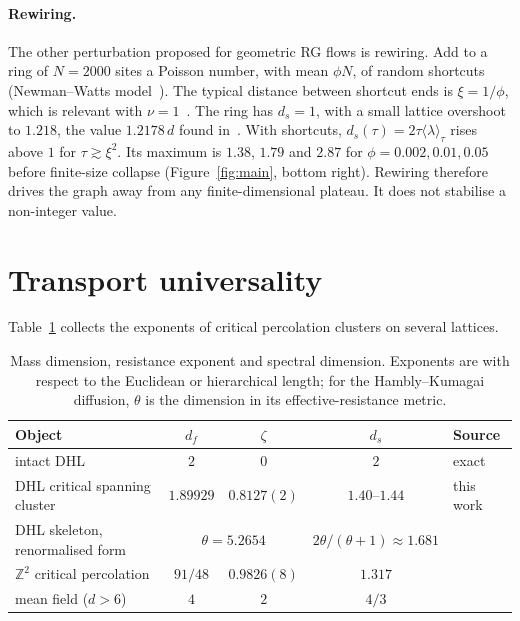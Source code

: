 \documentclass[11pt]{article}
\theoremstyle{remark}\newtheorem*{remark}{Remark}
\newcommand{\ZZ}{\mathbb{Z}}
\begin{document}
\paragraph{Rewiring.} The other perturbation proposed for geometric RG flows is rewiring. Add to a ring of $N=2000$ sites a
Poisson number, with mean $\phi N$, of random shortcuts (Newman--Watts model~\cite{WattsStrogatz,NewmanWatts}). The typical
distance between shortcut ends is $\xi=1/\phi$, which is relevant with $\nu=1$~\cite{NewmanWatts}. The ring has
$d_s=1$, with a small lattice overshoot to $1.218$, the value $1.2178\,d$ found in~\cite{Chen2026_qgc}. With shortcuts,
$d_s(\tau)=2\tau\langle\lambda\rangle_\tau$ rises above $1$ for $\tau\gtrsim\xi^2$. Its maximum is $1.38$, $1.79$ and $2.87$ for $\phi=0.002,0.01,0.05$
before finite-size collapse (Figure~\ref{fig:main}, bottom right). Rewiring therefore drives the graph away from any
finite-dimensional plateau. It does not stabilise a non-integer value.

\section{Transport universality}
\label{sec:universality}

Table~\ref{tab:compare} collects the exponents of critical percolation clusters on several lattices.

\begin{table}[ht]
\centering
\caption{Mass dimension, resistance exponent and spectral dimension. Exponents are with respect to the Euclidean or
hierarchical length; for the Hambly--Kumagai diffusion, $\theta$ is the dimension in its effective-resistance metric.}
\label{tab:compare}
\begin{tabular}{lcccl}
\toprule
Object & $d_f$ & $\zeta$ & $d_s$ & Source \\
\midrule
intact DHL & $2$ & $0$ & $2$ & exact \\
DHL critical spanning cluster & $1.89929$ & $0.8127(2)$ & $1.40$--$1.44$ & this work \\
DHL skeleton, renormalised form & \multicolumn{2}{c}{$\theta=5.2654$} & $2\theta/(\theta+1)\approx1.681$ & \cite{HamblyKumagai} \\
$\ZZ^2$ critical percolation & $91/48$ & $0.9826(8)$ & $1.317$ & \cite{Grassberger,StaufferAharony} \\
mean field ($d>6$) & $4$ & $2$ & $4/3$ & \cite{AlexanderOrbach,KozmaNachmias} \\
\bottomrule
\end{tabular}
\end{table}
\end{document}
